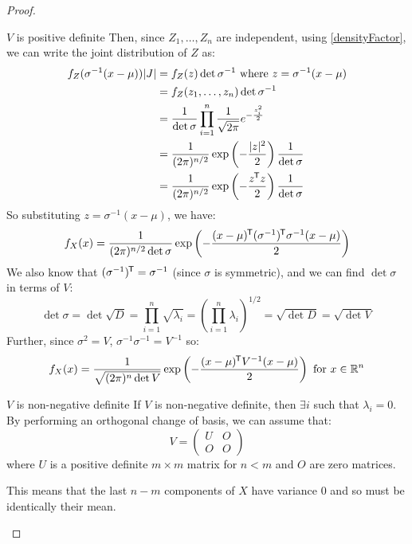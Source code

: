 \documentclass[../main.tex]{subfiles}
\begin{document}
\begin{proof}
\begin{proofcases}
\begin{case}{$V$ is positive definite}
      Then, since $Z_1, \ldots, Z_n$ are independent, using \cref{densityFactor}, we can write the joint distribution of $Z$ as:
      \begin{align*}
        f_{Z}(\sigma^{-1} (x - \mu)) |J| &= f_Z(z) \det \sigma^{-1} \text{ where $z = \sigma^{-1}(x - \mu)$}\\
                                         &= f_{Z}(z_1, \ldots, z_n) \det \sigma^{-1} \\
                                         &= \frac{1}{\det \sigma} \prod_{i = 1}^{n} \frac{1}{\sqrt{2\pi}}e^{-\frac{z^2_i}{2}} \\
                                         &= \frac{1}{(2\pi)^{n/2}}\exp\left(- \frac{|z|^2}{2}\right) \frac{1}{\det \sigma} \\
                                         &= \frac{1}{(2\pi)^{n/2}}\exp\left(- \frac{z^{{\mkern-1.5mu\mathsf{T}}}z}{2}\right) \frac{1}{\det \sigma}
      \end{align*}
      So substituting $z = \sigma^{-1}(x - \mu)$, we have:
      \[
        f_{X}(x) = \frac{1}{(2\pi)^{n/2} \det \sigma}\exp\left(- \frac{(x - \mu)^{{\mkern-1.5mu\mathsf{T}}}(\sigma^{-1})^{{\mkern-1.5mu\mathsf{T}}}\sigma^{-1}(x - \mu)}{2}\right)
      \]
      We also know that $(\sigma^{-1})^{{\mkern-1.5mu\mathsf{T}}} = \sigma^{-1}$ (since $\sigma$ is symmetric), and we can find $\det \sigma$ in terms of $V$:
      \[
        \det \sigma = \det \sqrt{D} =  \prod_{i=1}^{n} \sqrt{\lambda_i} = \left(\prod_{i =1}^{n} \lambda_i\right)^{1/2} = \sqrt{\det D} = \sqrt{\det V}
      \]
      Further, since $\sigma^2 = V$, $\sigma^{-1} \sigma^{-1} = V^{-1}$ so:
      \[
        f_{X}(x) = \frac{1}{\sqrt{(2\pi)^{n} \det V}}\exp\left(- \frac{(x - \mu)^{{\mkern-1.5mu\mathsf{T}}}V^{-1}(x - \mu)}{2}\right) \text{ for $x \in \mathbb{R}^{n}$}
      \]
    \end{case}
    \begin{case}{$V$ is non-negative definite}
      If $V$ is non-negative definite, then $\exists i$ such that $\lambda_i = 0$.
      By performing an orthogonal change of basis, we can assume that:
      \[
        V = \left(\begin{array}{c|c}
          U & O \\ \hline
          O & O
        \end{array}\right)
      \]
      where $U$ is a positive definite $m \times m$ matrix for $n < m$ and $O$ are zero matrices.

      This means that the last $n - m$ components of $X$ have variance $0$ and so must be identically their mean.


\end{case}
\end{proofcases}
\end{proof}
\end{document}
